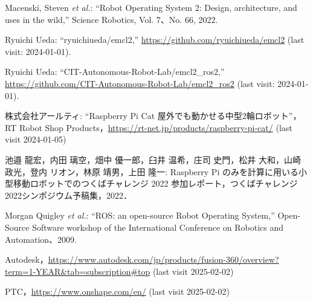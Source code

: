 \documentclass[twocolumn,9pt]{jsproceedings}
\begin{document}
\footnotesize
\begin{thebibliography}{99}

  Macenski, Steven {\it et al.}: ``Robot Operating System 2: Design, architecture, and uses in the wild,''
  Science Robotics, Vol. 7、No. 66, 2022.

  Ryuichi Ueda: ``ryuichiueda/emcl2,'' \url{https://github.com/ryuichiueda/emcl2} (last visit: 2024-01-01).

  Ryuichi Ueda: ``CIT-Autonomous-Robot-Lab/emcl2\_ros2,'' \url{https://github.com/CIT-Autonomous-Robot-Lab/emcl2_ros2} (last visit: 2024-01-01).


  株式会社アールティ: ``Raspberry Pi Cat 屋外でも動かせる中型2輪ロボット''，
  RT Robot Shop Products，\url{https://rt-net.jp/products/raspberry-pi-cat/} (last visit 2024-01-05)

  池邉 龍宏，内田 璃空，畑中 優一郎，臼井 温希，庄司 史門，松井 大和，山崎 政光，登内 リオン，林原 靖男，上田 隆一: Raspberry Pi のみを計算に用いる小型移動ロボットでのつくばチャレンジ 2022 参加レポート，つくばチャレンジ2022シンポジウム予稿集，2022．

  Morgan Quigley {\it et al.}: ``ROS: an open-source Robot Operating System,''
  Open-Source Software workshop of the International Conference on Robotics and Automation、2009.

  Autodesk，\url{https://www.autodesk.com/jp/products/fusion-360/overview?term=1-YEAR&tab=subscription#top} (last visit 2025-02-02)

  PTC，\url{https://www.onshape.com/en/} (last visit 2025-02-02)






\end{thebibliography}
\end{document}
